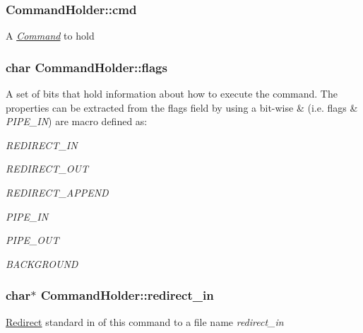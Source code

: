 \subsubsection[{\texorpdfstring{cmd}{cmd}}]{ Command\+Holder\+::cmd}\hypertarget{structCommandHolder_a83a7e82024a6f736ffebed0792aa12a9}{}\label{structCommandHolder_a83a7e82024a6f736ffebed0792aa12a9}
A {\itshape \hyperlink{unionCommand}{Command}} to hold 
\subsubsection[{\texorpdfstring{flags}{flags}}]{\setlength{\rightskip}{0pt plus 5cm}char Command\+Holder\+::flags}\hypertarget{structCommandHolder_acb381d6ab29bc574dc1ff452adc7847a}{}\label{structCommandHolder_acb381d6ab29bc574dc1ff452adc7847a}
A set of bits that hold information about how to execute the command. The properties can be extracted from the flags field by using a bit-\/wise \& (i.\+e. {\ttfamily flags} \& {\itshape P\+I\+P\+E\+\_\+\+IN}) are macro defined as\+:
\begin{DoxyItemize}
\item {\itshape R\+E\+D\+I\+R\+E\+C\+T\+\_\+\+IN} 
\item {\itshape R\+E\+D\+I\+R\+E\+C\+T\+\_\+\+O\+UT} 
\item {\itshape R\+E\+D\+I\+R\+E\+C\+T\+\_\+\+A\+P\+P\+E\+ND} 
\item {\itshape P\+I\+P\+E\+\_\+\+IN} 
\item {\itshape P\+I\+P\+E\+\_\+\+O\+UT} 
\item {\itshape B\+A\+C\+K\+G\+R\+O\+U\+ND} 
\end{DoxyItemize}
\subsubsection[{\texorpdfstring{redirect\+\_\+in}{redirect_in}}]{\setlength{\rightskip}{0pt plus 5cm}char$\ast$ Command\+Holder\+::redirect\+\_\+in}\hypertarget{structCommandHolder_a3691bd22096644e8c6be327fc7d0d246}{}\label{structCommandHolder_a3691bd22096644e8c6be327fc7d0d246}
\hyperlink{structRedirect}{Redirect} standard in of this command to a file name {\itshape redirect\+\_\+in} 
